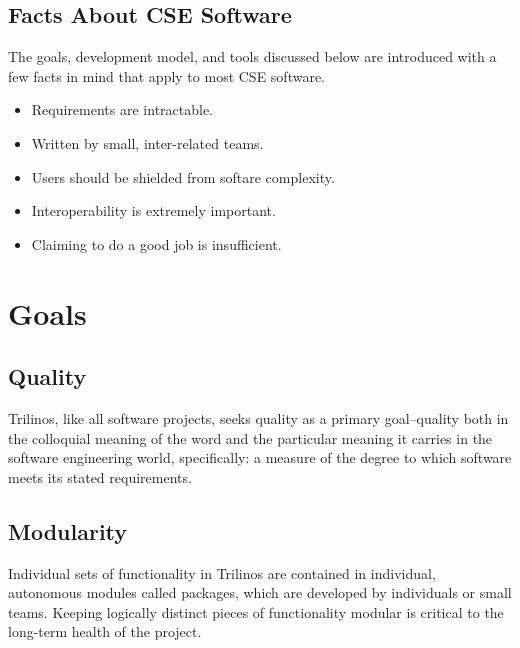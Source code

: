\documentclass[12pt,relax]{article}
\begin{document}
\subsection{Facts About CSE Software}
\label{Subsection:Facts}


The goals, development model, and tools discussed below are introduced with
a few facts in mind that apply to most CSE software.  

\begin{itemize}

\item Requirements are intractable.



\item Written by small, inter-related teams.

\item Users should be shielded from softare complexity.

\item Interoperability is extremely important.

\item Claiming to do a good job is insufficient.

\end{itemize}


\section{Goals}
\label{Section:Goals}

\subsection{Quality}
Trilinos, like all software projects, seeks quality as a primary goal--quality
both in the colloquial meaning of the word and the particular meaning it
carries in the software engineering world, specifically:  a measure of the
degree to which software meets its stated requirements.

\subsection{Modularity}
Individual sets of functionality in Trilinos are contained in individual,
autonomous modules called packages, which are developed by individuals or small
teams.  Keeping logically distinct pieces of functionality modular is critical
to the long-term health of the project.  
\end{document}
